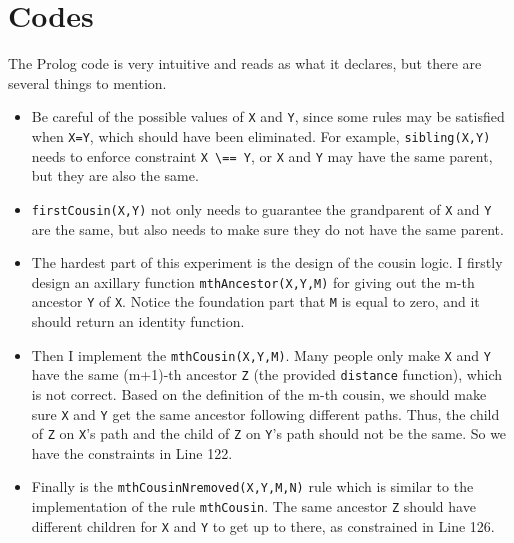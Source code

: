 ﻿\documentclass[a4paper, 11pt]{article}
\begin{document}
\section{Codes}
The Prolog code is very intuitive and reads as what it declares, but there are several things to mention.
\begin{itemize}
	\item Be careful of the possible values of \verb'X' and \verb'Y', since some rules may be satisfied when \verb'X=Y', which should have been eliminated.
	For example, \verb'sibling(X,Y)' needs to enforce constraint \verb'X \== Y', or \verb'X' and \verb'Y' may have the same parent, but they are also the same.
	\item \verb'firstCousin(X,Y)' not only needs to guarantee the grandparent of \verb'X' and \verb'Y' are the same, but also needs to make sure they do not have the same parent.
	\item The hardest part of this experiment is the design of the cousin logic.
	I firstly design an axillary function \verb'mthAncestor(X,Y,M)' for giving out the m-th ancestor \verb'Y' of \verb'X'.
	Notice the foundation part that \verb'M' is equal to zero, and it should return an identity function.
	\item Then I implement the \verb'mthCousin(X,Y,M)'.
	Many people only make \verb'X' and \verb'Y' have the same (m+1)-th ancestor \verb'Z' (the provided \verb'distance' function), which is not correct.
	Based on the definition of the m-th cousin, we should make sure \verb'X' and \verb'Y' get the same ancestor following different paths.
	Thus, the child of \verb'Z' on \verb'X''s path and the child of \verb'Z' on \verb'Y''s path should not be the same.
	So we have the constraints in Line 122.
	\item Finally is the \verb'mthCousinNremoved(X,Y,M,N)' rule which is similar to the implementation of the rule \verb'mthCousin'.
	The same ancestor \verb'Z' should have different children for \verb'X' and \verb'Y' to get up to there, as constrained in Line 126.
\end{itemize}
\end{document}
